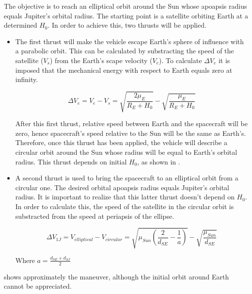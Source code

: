 The objective is to reach an elliptical orbit around the Sun whose apoapsis radius equals Jupiter's orbital radius. The starting point is  a satellite orbiting Earth at a determined $H_0$. In order to achieve this, two thrusts will be applied. 

\begin{itemize}
\item The first thrust will make the vehicle escape Earth's sphere of influence with a parabolic orbit. This can be calculated by substracting the speed of the satellite ($V_{s}$) from the Earth's scape velocity ($V_{e}$). To calculate $\Delta V_{e}$ it is imposed that the mechanical energy with respect to Earth equals zero at infinity.

\begin{equation}\label{eq:thrust}
\Delta V_e = V_e - V_s = \sqrt{\frac{2\mu_E}{R_E + H_0}}-\sqrt{\frac{\mu_E}{R_E+H_0}}
\end {equation}

After this first thrust, relative speed between Earth and the spacecraft will be zero, hence spacecraft's speed relative to the Sun will be the same as Earth's. Therefore, once this thrust has been applied, the vehicle will describe a circular orbit around the Sun whose radius will be equal to Earth's orbital radius. This thrust depends on initial $H_0$, as shown in . %

\item A second thrust is used to bring the spacecraft to an elliptical orbit from a circular one. The desired orbital apoapsis radius equals Jupiter's orbital radius. It is important to realize that this latter thrust doesn't depend on $H_0$. In order to calculate this, the speed of the satellite in the circular orbit is substracted from the speed at periapsis of the ellipse.



\begin{equation}\label{eq:DV1J}
\Delta V_{1J} = V_{elliptical}-V_{circular} = \sqrt {\mu_{Sun}\left(\frac{2}{d_{SE}}-\frac{1}{a}\right)}-\sqrt{\frac{\mu_{Sun}}{d_{SE}}}
\end{equation}

Where $a = \frac{d_{SE} + d_{SJ}}{2}$

\end{itemize}

 shows approximately the maneuver, although the initial orbit around Earth cannot be appreciated.\\

